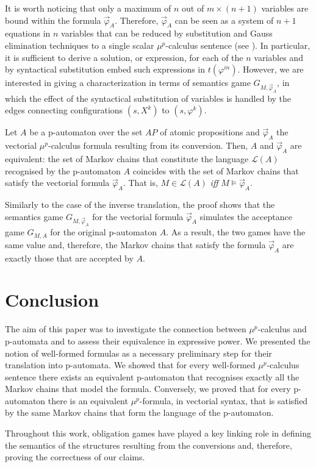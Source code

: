 \documentclass[a4paper,UKenglish]{oasics-v2016}
\begin{document}
It is worth noticing that only a maximum of $n$ out of 
$m\times(n+1)$ variables are bound within the formula $\vec\varphi_A$.
Therefore, $\vec\varphi_A$ can be seen as a system of $n+1$ equations in $n$ 
variables that can be reduced by substitution and Gauss elimination techniques 
to a single scalar $\mu^p$-calculus sentence (see \cite{Sch04}).
In particular, it is sufficient to derive a solution, or expression, for each 
of the $n$ variables and by syntactical substitution embed such expressions in 
$t(\varphi^{in})$.
However, we are interested in giving a characterization in terms of semantics 
game $G_{M,\vec\varphi_A}$, in which the effect of the syntactical substitution 
of variables is handled by the edges connecting configurations $(s, X^k)$ to 
$(s,\varphi^k)$.
%
\begin{theorem}\label{the:PautToMup}
	Let $A$ be a p-automaton over the set $AP$ of atomic propositions and 
	$\vec\varphi_A$ the vectorial $\mu^p$-calculus formula resulting from its 
	conversion.
	Then, $A$ and $\vec\varphi_A$ are equivalent: the set of Markov chains that 
	constitute the language $\mathcal{L}(A)$ recognised by the p-automaton $A$ 
	coincides with the set of Markov chains that satisfy the vectorial formula 
	$\vec\varphi_A$.
	That is, $M\!\in\!\mathcal{L}(A)$ \emph{iff} $M\!\models\!\vec\varphi_A$.
\end{theorem}
Similarly to the case of the inverse translation, the proof %
shows that the semantics game $G_{M,\vec\varphi_A}$ for the 
vectorial formula $\vec\varphi_A$ simulates the acceptance game $G_{M,A}$ for 
the original p-automaton $A$.
As a result, the two games have the same value and, therefore, the Markov 
chains that satisfy the formula $\vec\varphi_A$ are exactly those that are 
accepted by $A$.

\section{Conclusion}
The aim of this paper was to investigate the connection between 
$\mu^p$-calculus and p-automata and to assess their equivalence in expressive 
power.
We presented the notion of well-formed formulas as a necessary preliminary step 
for their translation into p-automata.
We showed that for every well-formed $\mu^p$-calculus sentence there exists an 
equivalent p-automaton that recognises exactly all the Markov chains that model 
the formula.
Conversely, we proved that for every p-automaton there is an equivalent 
$\mu^p$-formula, in vectorial syntax, that is satisfied by the same Markov 
chains 
that form the language of the p-automaton.

Throughout this work, obligation games have played a key linking role in 
defining the semantics of the structures resulting from the conversions and, 
therefore, proving the correctness of our claims.



\end{document}

